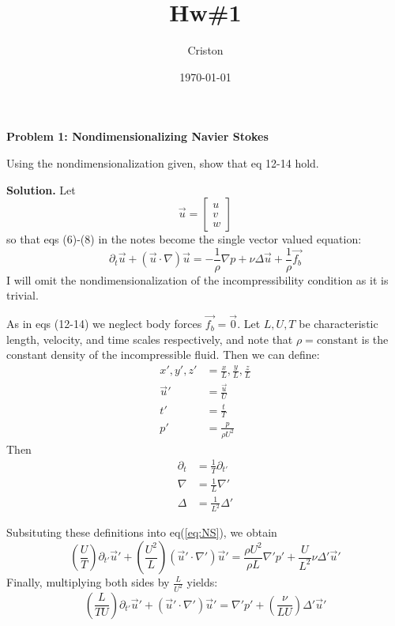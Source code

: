\documentclass[11pt]{article}
\author{Criston}
\date{\today}
\title{Hw\#1}
\begin{document}
\maketitle

\textbf{Problem 1: Nondimensionalizing Navier Stokes}

Using the nondimensionalization given, show that eq 12-14 hold.

\textbf{Solution.}
Let
\begin{equation}
  \vec{u} =
  \begin{bmatrix}
    u\\ v\\ w
  \end{bmatrix}
\end{equation}
so that eqs (6)-(8) in the notes become the single vector valued equation:
\begin{equation}
  \label{eq:NS}
  \partial_t \vec{u} + \left(\vec{u}\cdot \nabla \right)\vec{u} = -\frac{1}{\rho}\nabla p + \nu \Delta \vec{u} + \frac{1}{\rho}\vec{f_b}
\end{equation}
I will omit the nondimensionalization of the incompressibility condition as it is trivial.

As in eqs (12-14) we neglect body forces $\vec{f_b} = \vec{0}$. Let $L,U,T$ be characteristic length, velocity, and time scales respectively, and note that $\rho = \text{constant}$ is the constant density of the incompressible fluid. Then we can define:
\begin{align}
  \label{eq:dimlessCoords}
  x',y',z' &= \frac{x}{L}, \frac{y}{L}, \frac{z}{L}\\
  \vec{u}' &= \frac{\vec{u}}{U}\\
  t' &= \frac{t}{T}\\
  p' &= \frac{p}{\rho U^2}
\end{align}
Then
\begin{align}
  \label{eq:dimlessOps}
  \partial_t &= \frac{1}{T}\partial_{t'}\\
  \nabla &= \frac{1}{L}\nabla'\\
  \Delta &= \frac{1}{L^2}\Delta'
\end{align}

Subsituting these definitions into eq(\ref{eq:NS}), we obtain
\begin{equation}
  \left( \frac{U}{T} \right) \partial_{t'} \vec{u}' + \left( \frac{U^2}{L} \right) \left(\vec{u}' \cdot \nabla'\right)\vec{u}'
  = \frac{\rho U^2}{\rho L} \nabla'p' + \frac{U}{L^2} \nu \Delta' \vec{u}'
\end{equation}
Finally, multiplying both sides by $\frac{L}{U^2}$ yields:
\begin{equation}
  \label{eq:nondimNS}
  \left( \frac{L}{TU} \right) \partial_{t'} \vec{u}' + \left(\vec{u}' \cdot \nabla'\right)\vec{u}'
  = \nabla'p' + \left( \frac{\nu}{LU} \right)\Delta' \vec{u}'
\end{equation}
\end{document}
